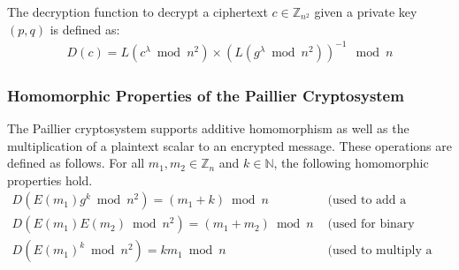 The decryption function to decrypt a ciphertext $c \in \mathbb{Z}_{n^2}$ given a private key $(p,q)$ is defined as:
\begin{align*}
  D(c) = L(c^\lambda \bmod n^2) \times (L(g^\lambda \bmod n^2))^{-1} \mod n
\end{align*}

\subsubsection{Homomorphic Properties of the Paillier Cryptosystem}
The Paillier cryptosystem supports additive homomorphism as well as the multiplication of a plaintext scalar to an encrypted message. These operations are defined as follows.
For all $m_1,m_2 \in \mathbb{Z}_n$ and $k\in \mathbb{N}$, the following homomorphic properties hold.
\begin{align*}
  D(E(m_1)g^k\bmod n^2)=(m_1+k)\bmod n & \text{ (used to add a constant)}\\
  D(E(m_1)E(m_2)\bmod n^2)=(m_1+m_2)\bmod n & \text{ (used for binary addition)}\\
  D(E(m_1)^k\bmod n^2)= km_1\bmod n & \text{ (used to multiply a plaintext constant)}
\end{align*}




